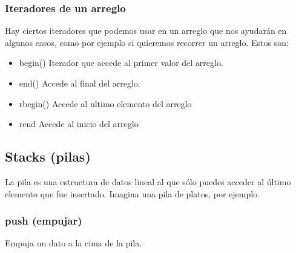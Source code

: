 \documentclass[letterpaper,10pt,spanish]{sphinxmanual}
\begin{document}
\subsubsection{Iteradores de un arreglo}
\label{\detokenize{edd/lineales:iteradores-de-un-arreglo}}
Hay ciertos iteradores que podemos usar en un arreglo que nos ayudarán en algunos casos, como por ejemplo si quieremos recorrer un arreglo. Estos son:
\begin{itemize}
\item {} 
begin() \textendash{} Iterador que accede al primer valor del arreglo.

\item {} 
end() \textendash{} Accede al final del arreglo.

\item {} 
rbegin() \textendash{} Accede al ultimo elemento del arreglo

\item {} 
rend \textendash{} Accede al inicio del arreglo

\end{itemize}


\subsection{Stacks (pilas)}
\label{\detokenize{edd/lineales:stacks-pilas}}
La pila es una estructura de datos lineal al que sólo puedes acceder al último elemento que fue insertado. Imagina una pila de platos, por ejemplo.

\begin{sphinxVerbatim}[commandchars=\\\{\},numbers=left,firstnumber=1,stepnumber=1]
        
\end{sphinxVerbatim}


\subsubsection{push (empujar)}
\label{\detokenize{edd/lineales:push-empujar}}
Empuja un dato a la cima de la pila.

\begin{sphinxVerbatim}[commandchars=\\\{\},numbers=left,firstnumber=1,stepnumber=1]
\end{sphinxVerbatim}
\end{document}
